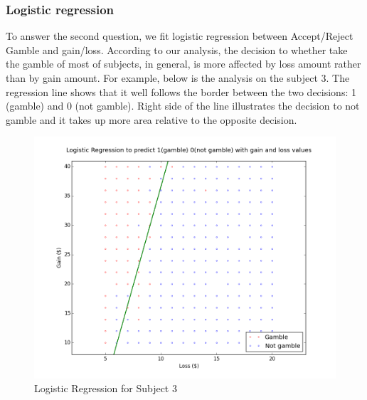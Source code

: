 \subsubsection {Logistic regression}
\noindent
To answer the second question, we fit logistic regression between Accept/Reject
Gamble and gain/loss. According to our analysis, the decision to whether take 
the gamble of most of subjects, in general, is more affected by loss amount 
rather than by gain amount.  For example, below is the analysis on the subject 
3. The regression line shows that it well follows the border between the two 
decisions: 1 (gamble) and 0 (not gamble). Right side of the line illustrates 
the decision to not gamble and it takes up more area relative to the opposite 
decision.
\begin{figure}[H]
    \centering
        \includegraphics[scale=0.5]{log_regression.png}
    \caption{Logistic Regression for Subject 3}
\end{figure}



